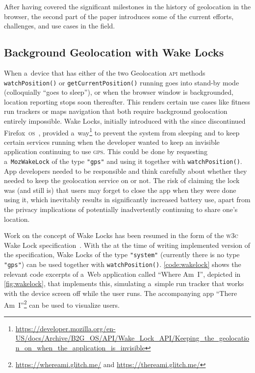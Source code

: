 \documentclass[sigconf,hyphens]{acmart}
\begin{document}
After having covered the significant milestones in the history of geolocation in the browser,
the second part of the paper introduces some of the current efforts, challenges,
and use cases in the field.

\subsection{Background Geolocation with Wake Locks}
\label{sec:wakelocks}

When a~device that has either of the two Geolocation \textsc{api} methods
\texttt{watchPosition()} or \texttt{getCurrentPosition()} running
goes into stand-by mode (colloquially ``goes to sleep''), or
when the browser window is backgrounded, location reporting stops soon thereafter.
This renders certain use cases like fitness run trackers or maps navigation
that both require background geolocation entirely impossible.
Wake Locks, initially introduced with the since discontinued
Firefox~\textsc{os}~\cite{francis2017firefoxos}, provided
a~way\footnote{\url{https://developer.mozilla.org/en-US/docs/Archive/B2G_OS/API/Wake_Lock_API/Keeping_the_geolocation_on_when_the_application_is_invisible}}
to prevent the system from sleeping and to keep certain services running
when the developer wanted to keep an invisible application continuing to use \textsc{gps}.
This could be done by requesting a~\texttt{MozWakeLock} of the type \texttt{"gps"}
and using it together with \texttt{watchPosition()}.
App developers needed to be responsible and think carefully about
whether they needed to keep the geolocation service on or not.
The risk of claiming the lock was (and still is) that users may forget to close the app
when they were done using it, which inevitably results in significantly increased battery use,
apart from the privacy implications of potentially inadvertently continuing to share one's location.

Work on the concept of Wake Locks has been resumed in the form of the \textsc{w3c}
Wake Lock specification~\cite{bogdanovich2017wakelock}.
With the at the time of writing implemented version of the specification,
Wake Locks of the type \texttt{"system"}
(currently there is no type \texttt{"gps"}) can be used together with \texttt{watchPosition()}.
\autoref{code:wakelock} shows the relevant code excerpts of a~Web application
called ``Where Am~I'', depicted in \autoref{fig:wakelock}, that implements this,
simulating a~simple run tracker that works with the device screen off while the user runs.
The accompanying app ``There Am~I''\footnote{\url{https://whereami.glitch.me/} and
\url{https://thereami.glitch.me/}} can be used to visualize users.
\end{document}
